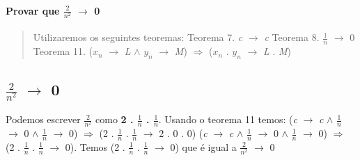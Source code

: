 
\paragraph{Provar que  $\frac{2}{n^2}$ $\rightarrow$ 0}

\begin{quote}
		Utilizaremos os seguintes teoremas:
		\newline
		Teorema 7. \textit{c} $\rightarrow$  \textit{c}
		\newline
		Teorema 8. $\frac{1}{n}$ $\rightarrow$ 0
		\newline
		Teorema 11. (\textit{$x_n$} $\rightarrow$ \textit{L} $\land$ \textit{$y_n$} $\rightarrow$ \textit{M}) $\Rightarrow$ (\textit{$x_n$} . \textit{$y_n$} $\rightarrow$ \textit{L} .  \textit{M})

\end{quote}

\subsection{ $\frac{2}{n^2}$ $\rightarrow$ 0}
	Podemos escrever  $\frac{2}{n^2}$ como  \textbf{2 . $\frac{1}{n}$ . $\frac{1}{n}$}. Usando o teorema 11 temos: \newline \newline
	(\textit{c} $\rightarrow$  \textit{c} $\land$ $\frac{1}{n}$ $\rightarrow$ 0 $\land$ $\frac{1}{n}$ $\rightarrow$ 0) $\Rightarrow$ (2 . $\frac{1}{n}$ . $\frac{1}{n}$ $\rightarrow$ 2 . 0 . 0)
	\newline\newline
	(\textit{c} $\rightarrow$  \textit{c} $\land$ $\frac{1}{n}$ $\rightarrow$ 0 $\land$ $\frac{1}{n}$ $\rightarrow$ 0) $\Rightarrow$ (2 . $\frac{1}{n}$ . $\frac{1}{n}$ $\rightarrow$  0).
	\newline\newline
	Temos (2 . $\frac{1}{n}$ . $\frac{1}{n}$ $\rightarrow$  0) que é igual a $\frac{2}{n^2}$ $\rightarrow$ 0

